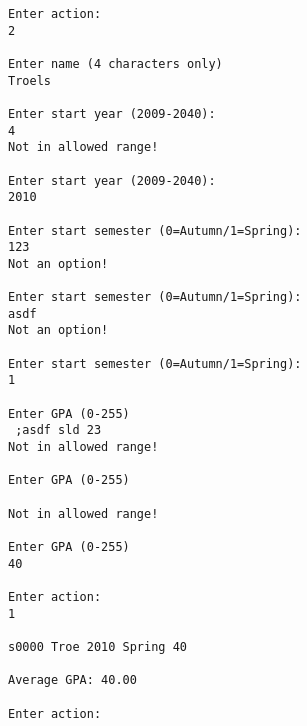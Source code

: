 \begin{verbatim}
Enter action:
2

Enter name (4 characters only)
Troels

Enter start year (2009-2040):
4
Not in allowed range!

Enter start year (2009-2040):
2010

Enter start semester (0=Autumn/1=Spring):
123
Not an option!

Enter start semester (0=Autumn/1=Spring):
asdf
Not an option!

Enter start semester (0=Autumn/1=Spring):
1

Enter GPA (0-255)
 ;asdf sld 23
Not in allowed range!

Enter GPA (0-255)

Not in allowed range!

Enter GPA (0-255)
40

Enter action:
1

s0000 Troe 2010 Spring 40

Average GPA: 40.00

Enter action:

\end{verbatim}
